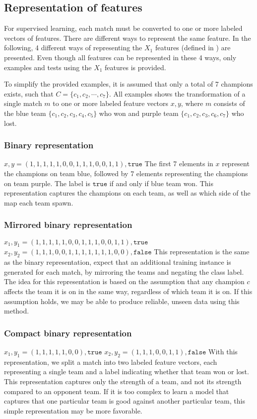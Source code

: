 
\subsection{Representation of features}
\label{sec:representationoffeatures}
For supervised learning, each match must be converted to one or more labeled vectors of features.
There are different ways to represent the same feature. In the following,
4 different ways of representing the $X_1$ features (defined in ) are presented.
Even though all features can be represented in these 4 ways, only examples and tests using the $X_1$ features is provided.

To simplify the provided examples, it is assumed that only a total of 7 champions exists, such that $C = \{c_1, c_2, \cdots, c_7\}$.
All examples shows the transformation of a single match $m$ to one or more labeled feature vectors $x, y$, where $m$ consists of the blue team $\{c_1,c_2,c_3,c_4,c_5\}$ who won and purple team $\{c_1,c_2,c_3,c_6,c_7\}$ who lost.

\subsubsection{Binary representation}
$x, y = (1,1,1,1,1,0,0,1,1,1,0,0,1,1), \texttt{true}$
The first 7 elements in $x$ represent the champions on team blue, followed by 7 elements representing the champions on team purple.
The label is $\texttt{true}$ if and only if blue team won.
This representation captures the champions on each team, as well as which side of the map each team spawn.

\subsubsection{Mirrored binary representation}
$x_1, y_1 = (1,1,1,1,1,0,0,1,1,1,0,0,1,1), \texttt{true}$
$x_2, y_2 = (1,1,1,0,0,1,1,1,1,1,1,1,0,0), \texttt{false}$
This representation is the same as the binary representation, expect that an additional training instance is generated for each match, by mirroring the teams and negating the class label.
The idea for this representation is based on the assumption that any champion $c$ affects the team it is on in the same way, regardless of which team it is on.
If this assumption holds, we may be able to produce reliable, unseen data using this method.

\subsubsection{Compact binary representation}
$x_1, y_1 = (1,1,1,1,1,0,0), \texttt{true}$
$x_2, y_2 = (1,1,1,0,0,1,1), \texttt{false}$
With this representation, we split a match into two labeled feature vectors, each representing a single team and a label indicating whether that team won or lost.
This representation captures only the strength of a team, and not its strength compared to an opponent team.
If it is too complex to learn a model that captures that one particular team is good against another particular team, this simple representation may be more favorable.

